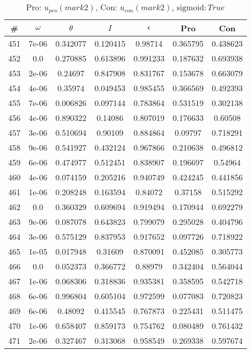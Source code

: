 \newpage
\begin{table}
\caption{Pro: $u_{pro} (mark 2)$, Con: $u_{con} (mark 2)$, $\mathrm{sigmoid}: True$}
\begin{tabular*}{\linewidth}{c|c|c|c|c|c|c}
\# & $\omega$ & $\theta$ & $I$ & $\epsilon$ & Pro & Con \\
\hline
451 & 7e-06 & 0.342077 & 0.120415 & 0.98714 & 0.365795 & 0.438623\\
452 & 0.0 & 0.270885 & 0.613896 & 0.991233 & 0.187632 & 0.693938\\
453 & 2e-06 & 0.24697 & 0.847908 & 0.831767 & 0.153678 & 0.663079\\
454 & 4e-06 & 0.35974 & 0.049453 & 0.985455 & 0.366569 & 0.492393\\
455 & 7e-06 & 0.006826 & 0.097144 & 0.783864 & 0.531519 & 0.302138\\
456 & 4e-06 & 0.890322 & 0.14086 & 0.807019 & 0.176633 & 0.60508\\
457 & 3e-06 & 0.510694 & 0.90109 & 0.884864 & 0.09797 & 0.718291\\
458 & 9e-06 & 0.541927 & 0.432124 & 0.967866 & 0.210638 & 0.496812\\
459 & 6e-06 & 0.474977 & 0.512451 & 0.838907 & 0.196697 & 0.54964\\
460 & 4e-06 & 0.074159 & 0.205216 & 0.940749 & 0.424245 & 0.441856\\
461 & 1e-06 & 0.208248 & 0.163594 & 0.84072 & 0.37158 & 0.515292\\
462 & 0.0 & 0.360329 & 0.609694 & 0.919494 & 0.170944 & 0.692279\\
463 & 9e-06 & 0.087078 & 0.643823 & 0.799079 & 0.295028 & 0.404796\\
464 & 3e-06 & 0.575129 & 0.837953 & 0.917652 & 0.097726 & 0.718922\\
465 & 1e-05 & 0.017948 & 0.31609 & 0.870091 & 0.452085 & 0.305773\\
466 & 0.0 & 0.052373 & 0.366772 & 0.88979 & 0.342404 & 0.564044\\
467 & 1e-06 & 0.068306 & 0.318836 & 0.935381 & 0.358595 & 0.542718\\
468 & 6e-06 & 0.996804 & 0.605104 & 0.972599 & 0.077083 & 0.720823\\
469 & 6e-06 & 0.48092 & 0.415545 & 0.767873 & 0.225431 & 0.511475\\
470 & 1e-06 & 0.658407 & 0.859173 & 0.754762 & 0.080489 & 0.761432\\
471 & 2e-06 & 0.327467 & 0.313068 & 0.958549 & 0.269338 & 0.597674\\

\end{tabular*}
\end{table}

